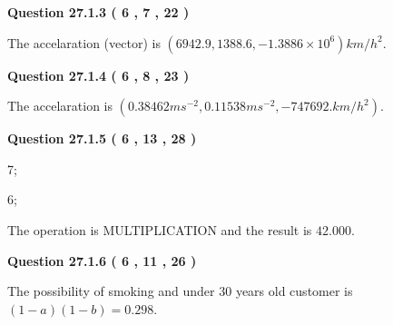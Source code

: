 \documentclass[12pt]{article}
\begin{document}
 
 
 
  
\vspace{0.2in}
  
{\textbf{\Large{Question
27.1.3 
 (           6 ,           7 ,          22 )
}}}
  
  
 
 
\noindent{}
 
 
The accelaration (vector) is
$(
6942.9,
1388.6 ,
-1.3886 \times 10^{6}
)km/h^2.
$
 
 
 
 
  
\vspace{0.2in}
  
{\textbf{\Large{Question
27.1.4 
 (           6 ,           8 ,          23 )
}}}
  
  
 
 
\noindent{}
 
 
The accelaration is
$(
0.38462ms^{-2},
0.11538ms^{-2},
-747692.km/h^2
).
$
 
 
 
 
  
\vspace{0.2in}
  
{\textbf{\Large{Question
27.1.5 
 (           6 ,          13 ,          28 )
}}}
  
  
 
 
\noindent{}

7;
 
6;
 
The operation is  %
MULTIPLICATION and the result is
$ %
42.000$.
 
 
 
  
\vspace{0.2in}
  
{\textbf{\Large{Question
27.1.6 
 (           6 ,          11 ,          26 )
}}}
  
  
 
 
\noindent{}

The possibility of  %
smoking and  %
under 30 years old
customer is $ (1-a)(1-b) =  %
0.298 $.
 
 
  
\end{document}
